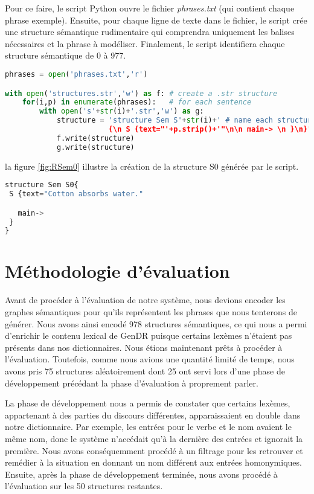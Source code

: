 Pour ce faire, le script Python ouvre le fichier \emph{phrases.txt} (qui contient chaque phrase exemple). Ensuite, pour chaque ligne de texte dans le fichier, le script crée une structure sémantique rudimentaire qui comprendra uniquement les balises nécessaires et la phrase à modéliser. Finalement, le script identifiera chaque structure sémantique de 0 à 977.

\begin{lstlisting}[language=Python, caption = Création des structures sémantiques vides, label=structurepython]
phrases = open('phrases.txt','r')

with open('structures.str','w') as f: # create a .str structure
    for(i,p) in enumerate(phrases):   # for each sentence
        with open('s'+str(i)+'.str','w') as g:
            structure = 'structure Sem S'+str(i)+' # name each structure by enumeration
						{\n S {text="'+p.strip()+'"\n\n main-> \n }\n}' # insert as texte the sentence
            f.write(structure)
            g.write(structure)
\end{lstlisting}

la figure \ref{fig:RSem0} illustre la création de la structure S0 générée par le script.

\begin{lstlisting}[language=Python, caption = Graphe sémantique de base généré par le script, label=fig:RSem0]
structure Sem S0{
 S {text="Cotton absorbs water."

   main-> 
 }
}
\end{lstlisting}

\section{Méthodologie d'évaluation}

Avant de procéder à l'évaluation de notre système, nous devions encoder les graphes sémantiques pour qu'ils représentent les phrases que nous tenterons de générer. Nous avons ainsi encodé 978 structures sémantiques, ce qui nous a permi d'enrichir le contenu lexical de GenDR puisque certains lexèmes n'étaient pas présents dans nos dictionnaires. Nous étions maintenant prêts à procéder à l'évaluation. Toutefois, comme nous avions une quantité limité de temps, nous avons pris 75 structures aléatoirement dont 25 ont servi lors d'une phase de développement précédant la phase d'évaluation à proprement parler. 

La phase de développement nous a permis de constater que certains lexèmes, appartenant à des parties du discours différentes, apparaissaient en double dans notre dictionnaire. Par exemple, les entrées pour le verbe  et le nom  avaient le même nom, donc le système n'accédait qu'à la dernière des entrées et ignorait la première. Nous avons conséquemment procédé à un filtrage pour les retrouver et remédier à la situation en donnant un nom différent aux entrées homonymiques. Ensuite, après la phase de développement terminée, nous avons procédé à l'évaluation sur les 50 structures restantes.
                              
